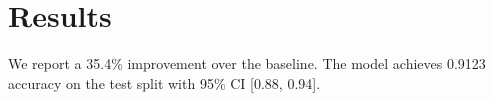 \section{Results}
We report a 35.4\% improvement over the baseline. The model achieves 0.9123
accuracy on the test split with 95\% CI [0.88, 0.94].
